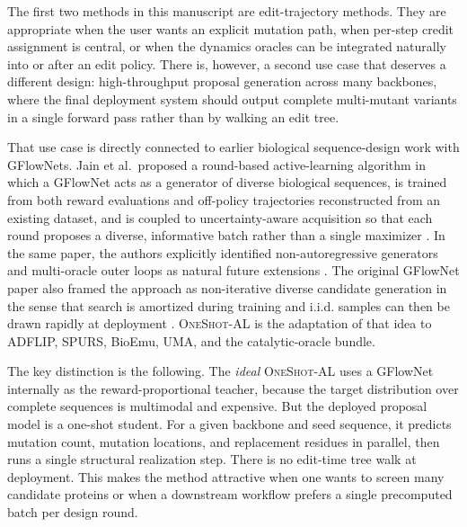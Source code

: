 \documentclass[11pt]{article}
\newcommand{\methodIII}{\textsc{OneShot-AL}}
\begin{document}
	The first two methods in this manuscript are edit-trajectory methods. They are appropriate when the user wants an explicit mutation path, when per-step credit assignment is central, or when the dynamics oracles can be integrated naturally into or after an edit policy. There is, however, a second use case that deserves a different design: high-throughput proposal generation across many backbones, where the final deployment system should output complete multi-mutant variants in a single forward pass rather than by walking an edit tree.
	
	That use case is directly connected to earlier biological sequence-design work with GFlowNets. Jain et al.~proposed a round-based active-learning algorithm in which a GFlowNet acts as a generator of diverse biological sequences, is trained from both reward evaluations and off-policy trajectories reconstructed from an existing dataset, and is coupled to uncertainty-aware acquisition so that each round proposes a diverse, informative batch rather than a single maximizer \citep{jain2022bioseqgfn}. In the same paper, the authors explicitly identified non-autoregressive generators and multi-oracle outer loops as natural future extensions \citep{jain2022bioseqgfn}. The original GFlowNet paper also framed the approach as non-iterative diverse candidate generation in the sense that search is amortized during training and i.i.d. samples can then be drawn rapidly at deployment \citep{bengio2021noniter}. \methodIII{} is the adaptation of that idea to ADFLIP, SPURS, BioEmu, UMA, and the catalytic-oracle bundle.
	
	The key distinction is the following. The \emph{ideal} \methodIII{} uses a GFlowNet internally as the reward-proportional teacher, because the target distribution over complete sequences is multimodal and expensive. But the deployed proposal model is a one-shot student. For a given backbone and seed sequence, it predicts mutation count, mutation locations, and replacement residues in parallel, then runs a single structural realization step. There is no edit-time tree walk at deployment. This makes the method attractive when one wants to screen many candidate proteins or when a downstream workflow prefers a single precomputed batch per design round.
	
\end{document}

